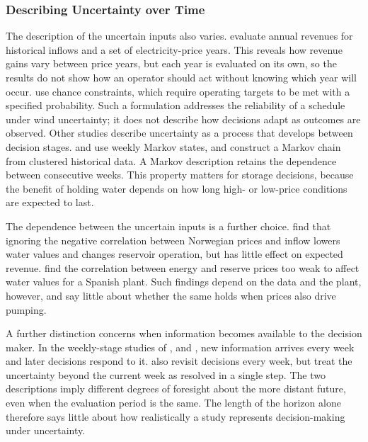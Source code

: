 \subsubsection{Describing Uncertainty over Time}

The description of the uncertain inputs also varies.
\citet{ak2019quantifying} evaluate annual revenues for historical inflows
and a set of electricity-price years. This reveals how revenue gains
vary between price years, but each year is evaluated on its own, so the
results do not show how an operator should act without knowing which
year will occur. \citet{naval2025optimization} use chance constraints,
which require operating targets to be met with a specified probability.
Such a formulation addresses the reliability of a schedule under wind
uncertainty; it does not describe how decisions adapt as outcomes are
observed. Other studies describe uncertainty as a process that develops
between decision stages. \citet{helseth2017iet} and
\citet{alic2023optimal} use weekly Markov states, and
\citet{bore2026assessing} construct a Markov chain from clustered
historical data. A Markov description retains the dependence between
consecutive weeks. This property matters for storage decisions, because
the benefit of holding water depends on how long high- or low-price
conditions are expected to last.

The dependence between the uncertain inputs is a further choice.
\citet{kleiven2023} find that ignoring the negative correlation between
Norwegian prices and inflow lowers water values and changes reservoir
operation, but has little effect on expected revenue.
\citet{perezdiaz2020medium} find the correlation between energy and
reserve prices too weak to affect water values for a Spanish plant.
Such findings depend on the data and the plant, however, and say little
about whether the same holds when prices also drive pumping.

A further distinction concerns when information becomes available to the
decision maker. In the weekly-stage studies of \citet{alic2023optimal},
\citet{helseth2016} and \citet{helseth2017iet}, new information arrives
every week and later decisions respond to it. \citet{helseth2017} also
revisit decisions every week, but treat the uncertainty beyond the
current week as resolved in a single step. The two descriptions imply
different degrees of foresight about the more distant future, even when
the evaluation period is the same. The length of the horizon alone
therefore says little about how realistically a study represents
decision-making under uncertainty.

